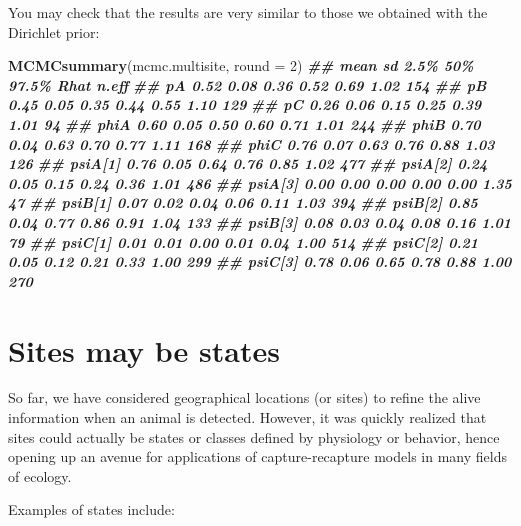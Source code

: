 \documentclass[
  12pt,
]{krantz}
\newenvironment{Shaded}{\begin{snugshade}}{\end{snugshade}}
\newcommand{\AttributeTok}[1]{\textcolor[rgb]{0.13,0.29,0.53}{#1}}
\newcommand{\DecValTok}[1]{\textcolor[rgb]{0.00,0.00,0.81}{#1}}
\newcommand{\DocumentationTok}[1]{\textcolor[rgb]{0.56,0.35,0.01}{\textbf{\textit{#1}}}}
\newcommand{\FunctionTok}[1]{\textcolor[rgb]{0.13,0.29,0.53}{\textbf{#1}}}
\newcommand{\NormalTok}[1]{#1}
\begin{document}
You may check that the results are very similar to those we obtained with the Dirichlet prior:

\begin{Shaded}
\begin{Highlighting}[]
\FunctionTok{MCMCsummary}\NormalTok{(mcmc.multisite, }\AttributeTok{round =} \DecValTok{2}\NormalTok{)}
\DocumentationTok{\#\#         mean   sd 2.5\%  50\% 97.5\% Rhat n.eff}
\DocumentationTok{\#\# pA      0.52 0.08 0.36 0.52  0.69 1.02   154}
\DocumentationTok{\#\# pB      0.45 0.05 0.35 0.44  0.55 1.10   129}
\DocumentationTok{\#\# pC      0.26 0.06 0.15 0.25  0.39 1.01    94}
\DocumentationTok{\#\# phiA    0.60 0.05 0.50 0.60  0.71 1.01   244}
\DocumentationTok{\#\# phiB    0.70 0.04 0.63 0.70  0.77 1.11   168}
\DocumentationTok{\#\# phiC    0.76 0.07 0.63 0.76  0.88 1.03   126}
\DocumentationTok{\#\# psiA[1] 0.76 0.05 0.64 0.76  0.85 1.02   477}
\DocumentationTok{\#\# psiA[2] 0.24 0.05 0.15 0.24  0.36 1.01   486}
\DocumentationTok{\#\# psiA[3] 0.00 0.00 0.00 0.00  0.00 1.35    47}
\DocumentationTok{\#\# psiB[1] 0.07 0.02 0.04 0.06  0.11 1.03   394}
\DocumentationTok{\#\# psiB[2] 0.85 0.04 0.77 0.86  0.91 1.04   133}
\DocumentationTok{\#\# psiB[3] 0.08 0.03 0.04 0.08  0.16 1.01    79}
\DocumentationTok{\#\# psiC[1] 0.01 0.01 0.00 0.01  0.04 1.00   514}
\DocumentationTok{\#\# psiC[2] 0.21 0.05 0.12 0.21  0.33 1.00   299}
\DocumentationTok{\#\# psiC[3] 0.78 0.06 0.65 0.78  0.88 1.00   270}
\end{Highlighting}
\end{Shaded}

\hypertarget{states}{%
\section{Sites may be states}\label{states}}

So far, we have considered geographical locations (or sites) to refine the alive information when an animal is detected. However, it was quickly realized that sites could actually be states or classes defined by physiology or behavior, hence opening up an avenue for applications of capture-recapture models in many fields of ecology.

Examples of states include:
\end{document}
